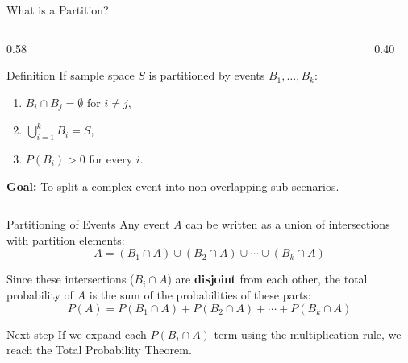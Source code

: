 \documentclass[light]{lutbeamer}
\begin{document}
\begin{frame}{What is a Partition?}
    \begin{columns}[T]
        \begin{column}{0.58\textwidth}
            \begin{block}{Definition}
                If sample space \(S\) is partitioned by events \(B_1,\dots,B_k\):
                \begin{enumerate}
                    \item \(B_i\cap B_j=\emptyset\) for \(i\neq j\),
                    \item \(\bigcup_{i=1}^{k} B_i=S\),
                    \item \(P(B_i)>0\) for every \(i\).
                \end{enumerate}
            \end{block}
            \textbf{Goal:} To split a complex event into non-overlapping sub-scenarios.
        \end{column}
        \begin{column}{0.40\textwidth}
            \centering
        \end{column}
    \end{columns}
\end{frame}

\begin{frame}{Partitioning of Events}
    Any event $A$ can be written as a union of intersections with partition elements:
    \[
    A = (B_1 \cap A) \cup (B_2 \cap A) \cup \cdots \cup (B_k \cap A)
    \]

    Since these intersections ($B_i \cap A$) are \textbf{disjoint} from each other, the total probability of $A$ is the sum of the probabilities of these parts:
    \[
    P(A) = P(B_1 \cap A) + P(B_2 \cap A) + \cdots + P(B_k \cap A)
    \]

    \begin{block}{Next step}
        If we expand each $P(B_i \cap A)$ term using the multiplication rule, we reach the Total Probability Theorem.
    \end{block}
\end{frame}
\end{document}
